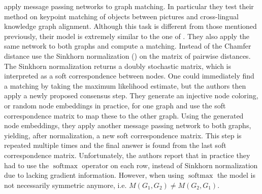 \cite{fey2020_update} apply message passing networks to graph matching. In particular they test their method on keypoint matching of objects between pictures and cross-lingual knowledge graph alignment. Although this task is different from those mentioned previously, their model is extremely similar to the one of \cite{riba2018}. They also apply the same network to both graphs and compute a matching. Instead of the Chamfer distance \cite{fey2020_update} use the Sinkhorn normalization (\citealp{sinkhorn2013}) on the matrix of pairwise distances. The Sinkhorn normalization returns a doubly stochastic matrix, which is interpreted as a soft correspondence between nodes. One could immediately find a matching by taking the maximum likelihood estimate, but the authors then apply a newly proposed consensus step. They generate an injective node coloring, or random node embeddings in practice, for one graph and use the soft correspondence matrix to map these to the other graph. Using the generated node embeddings, they apply another message passing network to both graphs, yielding, after normalization, a new soft correspondence matrix. This step is repeated multiple times and the final answer is found from the last soft correspondence matrix. Unfortunately, the authors report that in practice they had to use the $\operatorname{softmax}$ operator on each row, instead of Sinkhorn normalization due to lacking gradient information. However, when using $\operatorname{softmax}$ the model is not necessarily symmetric anymore, i.e. $M(G_1, G_2) \neq M(G_2, G_1)$.






